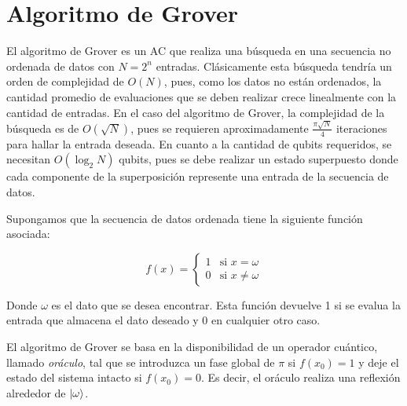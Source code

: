 \chapter{Algoritmo de Grover}

El algoritmo de Grover es un AC que realiza una búsqueda en una secuencia no ordenada de datos con $N=2^n$ entradas. Clásicamente esta búsqueda tendría un orden de complejidad de $O(N)$, pues, como los datos no están ordenados, la cantidad promedio de evaluaciones que se deben realizar crece linealmente con la cantidad de entradas. En el caso del algoritmo de Grover, la complejidad de la búsqueda es de $O(\sqrt{N})$, pues se requieren aproximadamente $\frac{\pi\sqrt{N}}{4}$ iteraciones para hallar la entrada deseada. En cuanto a la cantidad de qubits requeridos, se necesitan $O(\log_2 N)$ qubits, pues se debe realizar un estado superpuesto donde cada componente de la superposición represente una entrada de la secuencia de datos.

Supongamos que la secuencia de datos ordenada tiene la siguiente función asociada:

\begin{equation}
    f(x) =
    \begin{cases}
        1 & \text{si } x = \omega \\
        0 & \text{si } x \neq \omega
    \end{cases}
\end{equation}

Donde $\omega$ es el dato que se desea encontrar. Esta función devuelve 1 si se evalua la entrada que almacena el dato deseado y 0 en cualquier otro caso.

El algoritmo de Grover se basa en la disponibilidad de un operador cuántico, llamado \textit{oráculo}, tal que se introduzca un fase global de $\pi$ si $f(x_0)=1$ y deje el estado del sistema intacto si $f(x_0)=0$. Es decir, el oráculo realiza una reflexión alrededor de $\ket{\omega}$.

